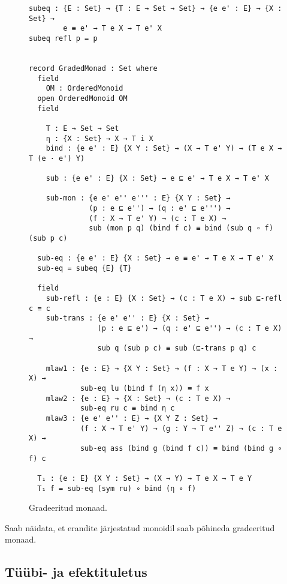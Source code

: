 \documentclass[a4paper,12pt]{article}
\begin{document}
\begin{figure}
  \begin{BVerbatim}
subeq : {E : Set} → {T : E → Set → Set} → {e e' : E} → {X : Set} →
        e ≡ e' → T e X → T e' X
subeq refl p = p


record GradedMonad : Set where
  field
    OM : OrderedMonoid
  open OrderedMonoid OM
  field

    T : E → Set → Set
    η : {X : Set} → X → T i X
    bind : {e e' : E} {X Y : Set} → (X → T e' Y) → (T e X → T (e · e') Y)

    sub : {e e' : E} {X : Set} → e ⊑ e' → T e X → T e' X

    sub-mon : {e e' e'' e''' : E} {X Y : Set} →
              (p : e ⊑ e'') → (q : e' ⊑ e''') → 
              (f : X → T e' Y) → (c : T e X) → 
              sub (mon p q) (bind f c) ≡ bind (sub q ∘ f) (sub p c) 

  sub-eq : {e e' : E} {X : Set} → e ≡ e' → T e X → T e' X
  sub-eq = subeq {E} {T}
 
  field
    sub-refl : {e : E} {X : Set} → (c : T e X) → sub ⊑-refl c ≡ c
    sub-trans : {e e' e'' : E} {X : Set} →
                (p : e ⊑ e') → (q : e' ⊑ e'') → (c : T e X) → 
                sub q (sub p c) ≡ sub (⊑-trans p q) c   

    mlaw1 : {e : E} → {X Y : Set} → (f : X → T e Y) → (x : X) →
            sub-eq lu (bind f (η x)) ≡ f x
    mlaw2 : {e : E} → {X : Set} → (c : T e X) →
            sub-eq ru c ≡ bind η c
    mlaw3 : {e e' e'' : E} → {X Y Z : Set} →
            (f : X → T e' Y) → (g : Y → T e'' Z) → (c : T e X) → 
            sub-eq ass (bind g (bind f c)) ≡ bind (bind g ∘ f) c 

  T₁ : {e : E} {X Y : Set} → (X → Y) → T e X → T e Y
  T₁ f = sub-eq (sym ru) ∘ bind (η ∘ f)
  \end{BVerbatim}
  \caption{Gradeeritud monaad.}
  \label{fig:graded-monad}
\end{figure}

Saab näidata, et erandite järjestatud monoidil saab põhineda gradeeritud monaad.

\subsection{Tüübi- ja efektituletus} \label{ssec:exc.inference}
\end{document}
